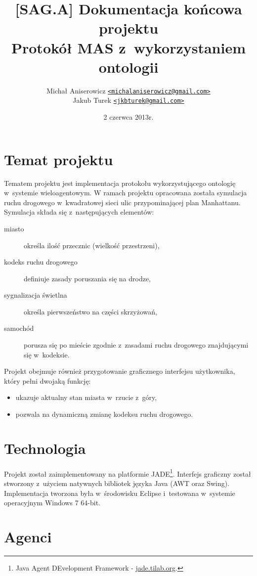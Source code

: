 \documentclass[a4paper,11pt]{article}
\author{Michał Aniserowicz \href{mailto:michalaniserowicz@gmail.com}{{\small \nolinkurl{<michalaniserowicz@gmail.com>}}} \\ Jakub Turek \href{mailto:jkbturek@gmail.com}{{\small \nolinkurl{<jkbturek@gmail.com>}}}}
\title{{\Large [SAG.A] Dokumentacja końcowa projektu} \\ Protokół MAS z~wykorzystaniem ontologii}
\date{2 czerwca 2013r.}
\begin{document}
\maketitle

\section{Temat projektu}

Tematem projektu jest implementacja protokołu wykorzystującego ontologię w~systemie wieloagentowym. W ramach projektu opracowana została symulacja ruchu drogowego w~kwadratowej sieci ulic przypominającej plan Manhattanu. Symulacja składa się z~następujących elementów:


\begin{description}
    \item[miasto] określa ilość przecznic (wielkość przestrzeni),
    \item[kodeks ruchu drogowego] definiuje zasady poruszania się na drodze,
    \item[sygnalizacja świetlna] określa pierwszeństwo na części skrzyżowań,
    \item[samochód] porusza się po mieście zgodnie z~zasadami ruchu drogowego znajdującymi się w~kodeksie.
\end{description}

Projekt obejmuje również przygotowanie graficznego interfejsu użytkownika, który pełni dwojaką funkcję:

\begin{itemize}
    \item ukazuje aktualny stan miasta w~rzucie z~góry,
    \item pozwala na dynamiczną zmianę kodeksu ruchu drogowego.
\end{itemize}

\section{Technologia}

Projekt został zaimplementowany na platformie JADE\footnote{Java Agent DEvelopment Framework - \href{http://jade.tilab.org}{jade.tilab.org}.}. Interfejs graficzny został stworzony z~użyciem natywnych bibliotek języka Java (AWT oraz Swing). Implementacja tworzona była w~środowisku Eclipse i~testowana w~systemie operacyjnym Windows 7 64-bit.

\section{Agenci}
\end{document}
